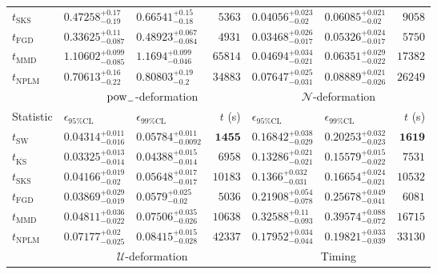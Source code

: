 \begin{tabular}{l|llr|llr}
	$t_{\mathrm{SKS}}$ & $0.47258_{-0.19}^{+0.17}$ & $0.66541_{-0.18}^{+0.15}$ & $5363$ & $0.04056_{-0.02}^{+0.023}$ & $0.06085_{-0.02}^{+0.021}$ & $9058$ \\
	$t_{\mathrm{FGD}}$ & ${\mathbf{0.33625_{-0.087}^{+0.11}}}$ & ${\mathbf{0.48923_{-0.084}^{+0.067}}}$ & $4931$ & ${\mathbf{0.03468_{-0.017}^{+0.026}}}$ & $0.05326_{-0.017}^{+0.024}$ & $5750$ \\
	$t_{\mathrm{MMD}}$ & $1.10602_{-0.085}^{+0.099}$ & $1.1694_{-0.046}^{+0.099}$ & $65814$ & $0.04694_{-0.021}^{+0.034}$ & $0.06351_{-0.022}^{+0.029}$ & $17382$ \\
\rowcolor{red!35}	$t_{\mathrm{NPLM}}$ & $0.70613_{-0.22}^{+0.16}$ & $0.80803_{-0.2}^{+0.19}$ & $34883$ & $0.07647_{-0.031}^{+0.025}$ & $0.08889_{-0.026}^{+0.021}$ & $26249$ \\
	\toprule
	\multicolumn{1}{c}{} & \multicolumn{3}{c}{$\rm{pow}_{-}$-deformation} & \multicolumn{3}{c}{$\mathcal{N}$-deformation} \\
Statistic & $\epsilon_{95\%\mathrm{CL}}$ & $\epsilon_{99\%\mathrm{CL}}$ & $t$ (s) & $\epsilon_{95\%\mathrm{CL}}$ & $\epsilon_{99\%\mathrm{CL}}$ & $t$ (s) \\
	\midrule
	$t_{\mathrm{SW}}$ & $0.04314_{-0.016}^{+0.011}$ & $0.05784_{-0.0092}^{+0.011}$ & ${\mathbf{1455}}$ & $0.16842_{-0.029}^{+0.038}$ & $0.20253_{-0.023}^{+0.032}$ & ${\mathbf{1619}}$ \\
	$t_{\overline{\mathrm{KS}}}$ & ${\mathbf{0.03325_{-0.014}^{+0.013}}}$ & ${\mathbf{0.04388_{-0.014}^{+0.015}}}$ & $6958$ & ${\mathbf{0.13286_{-0.021}^{+0.021}}}$ & ${\mathbf{0.15579_{-0.022}^{+0.015}}}$ & $7531$ \\
	$t_{\mathrm{SKS}}$ & $0.04166_{-0.02}^{+0.019}$ & $0.05648_{-0.017}^{+0.017}$ & $10183$ & $0.1366_{-0.031}^{+0.032}$ & $0.16654_{-0.021}^{+0.024}$ & $10532$ \\
	$t_{\mathrm{FGD}}$ & $0.03869_{-0.019}^{+0.029}$ & $0.0579_{-0.02}^{+0.025}$ & $5036$ & $0.21908_{-0.078}^{+0.054}$ & $0.25678_{-0.041}^{+0.049}$ & $6081$ \\
	$t_{\mathrm{MMD}}$ & $0.04811_{-0.022}^{+0.036}$ & $0.07506_{-0.026}^{+0.035}$ & $10638$ & $0.32588_{-0.093}^{+0.11}$ & $0.39574_{-0.072}^{+0.088}$ & $16715$ \\
\rowcolor{red!35}	$t_{\mathrm{NPLM}}$ & $0.07177_{-0.025}^{+0.02}$ & $0.08415_{-0.028}^{+0.015}$ & $42337$ & $0.17952_{-0.044}^{+0.034}$ & $0.19821_{-0.039}^{+0.033}$ & $33130$ \\
	\toprule
	\multicolumn{1}{c}{} & \multicolumn{3}{c}{$\mathcal{U}$-deformation} & \multicolumn{3}{c}{Timing} \\

\end{tabular}
